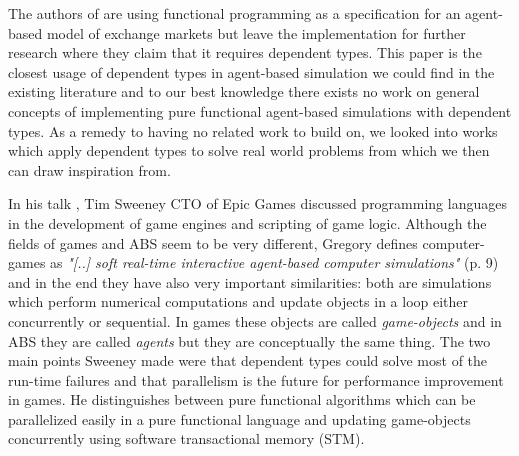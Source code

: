 The authors of \cite{botta_functional_2011} are using functional programming as a specification for an agent-based model of exchange markets but leave the implementation for further research where they claim that it requires dependent types. This paper is the closest usage of dependent types in agent-based simulation we could find in the existing literature and to our best knowledge there exists no work on general concepts of implementing pure functional agent-based simulations with dependent types. As a remedy to having no related work to build on, we looked into works which apply dependent types to solve real world problems from which we then can draw inspiration from.

In his talk \cite{sweeney_next_2006}, Tim Sweeney CTO of Epic Games discussed programming languages in the development of game engines and scripting of game logic. Although the fields of games and ABS seem to be very different, Gregory \cite{gregory_game_2018} defines computer-games as \textit{"[..] soft real-time interactive agent-based computer simulations"} (p. 9) and in the end they have also very important similarities: both are simulations which perform numerical computations and update objects in a loop either concurrently or sequential. In games these objects are called \textit{game-objects} and in ABS they are called \textit{agents} but they are conceptually the same thing. The two main points Sweeney made were that dependent types could solve most of the run-time failures and that parallelism is the future for performance improvement in games. He distinguishes between pure functional algorithms which can be parallelized easily in a pure functional language and updating game-objects concurrently using software transactional memory (STM).


